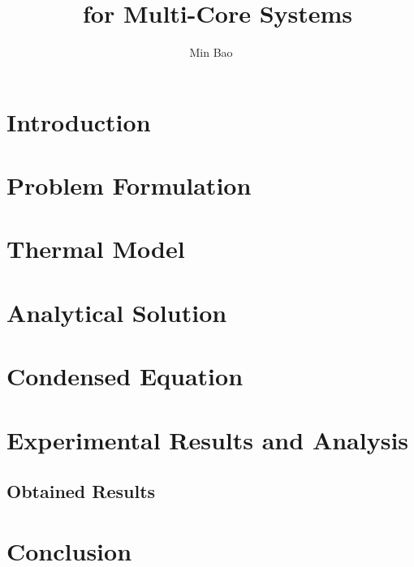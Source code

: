\documentclass[11pt,a4paper]{article}
\author{Min Bao}
\title{\ssdtc\ for Multi-Core Systems}
\begin{document}
  \maketitle

  \section{Introduction}

  \section{Problem Formulation}
  

  \section{Thermal Model}
  

  \section{Analytical Solution}
  

  \section{Condensed Equation}
  

  \section{Experimental Results and Analysis} \label{sec:experimental-results}
  

  \subsection{Obtained Results}

  \section{Conclusion}

  
\end{document}
